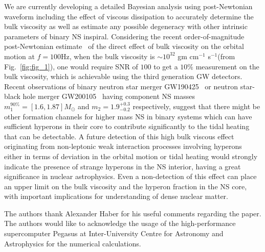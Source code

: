 \documentclass[%
 reprint,
 amsmath,amssymb,
 aps,
]{revtex4-2}
\begin{document}
We are currently developing a detailed Bayesian analysis using post-Newtonian waveform including the effect of viscous dissipation to accurately determine the bulk viscosity as well as estimate any possible degeneracy with other intrinsic parameters of binary NS inspiral. Considering the recent order-of-magnitude post-Newtonian estimate~\cite{Most_2021} of the direct effect of bulk viscosity on the orbital motion  at $f = 100$Hz, when the bulk viscosity is $\sim 10^{32}$ gm cm$^{-1}$ s$^{-1}$(from Fig.~\ref{fig:fig_1}), one would require  SNR of $100$ to get a $10\%$ measurement on the bulk viscosity, which is achievable using the third generation GW detectors. Recent observations of binary neutron star merger  GW190425~\cite{GW190425} or neutron star-black hole merger GW200105~\cite{NSBh} having component NS masses $m_1^{90\%} = [1.6,1.87]M_{\odot}$ and $m_2 = 1.9^{+0.3}_{-0.2}$ respectively, suggest that there might be other formation channels for higher mass NS in binary systems which can have sufficient hyperons in their core to contribute significantly to the tidal heating that can be detectable.  A future detection of this high bulk viscous effect originating from non-leptonic weak interaction processes involving hyperons either in terms of deviation in the orbital motion or tidal heating would strongly indicate the presence of strange hyperons in the NS interior, having a great significance in nuclear astrophysics. Even a non-detection of this effect can place an upper limit on the bulk viscosity and the hyperon fraction in the NS core, with important implications for understanding of dense nuclear matter. \\


\begin{acknowledgments}
 The authors thank Alexander Haber for his useful comments regarding the paper. The authors would like to acknowledge the usage of the high-performance supercomputer Pegasus at Inter-University Centre for Astronomy and Astrophysics for the numerical calculations.
\end{acknowledgments}



\nocite{*}

\end{document}
